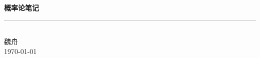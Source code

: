 \documentclass[10pt,a4paper]{book}
\theoremstyle{thmstyle}
\theoremstyle{defstyle}
\theoremstyle{prostyle}
\begin{document}
\begin{titlepage}
	\vspace*{4cm}
	\begin{center}
		{\fontsize{36}{44}\sffamily\bfseries 概率论笔记} \\[1.5cm]
		{\color{DarkBlue}\rule{0.3\textwidth}{0.5pt}} \\[1.5cm]
		{\fontsize{16}{20}\kaishu 魏舟} \\[0.3cm]
		{\large \today}
	\end{center}
\end{titlepage}

\newpage

\tableofcontents

\setcounter{page}{0}
\thispagestyle{empty}
\newpage







\end{document}
